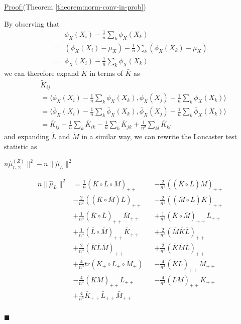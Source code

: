 \documentclass[]{article}
\newenvironment{claimproof}[1]{\par\noindent\underline{Proof:}\space#1}{\hfill $\blacksquare$}
\begin{document}
\begin{claimproof}(Theorem \ref{theorem:norm-conv-in-prob})

By observing that
\begin{align*}
& \phi_X(X_i)- \frac{1}{n}\sum_k\phi_X(X_k) \\
= &  (\phi_X(X_i) - \mu_X) - \frac{1}{n}\sum_k (\phi_X(X_k) - \mu_X)\\
= &\bar\phi_X(X_i)- \frac{1}{n}\sum_k\bar\phi_X(X_k)
\end{align*}
we can therefore expand $\tilde{K}$ in terms of $\bar{K}$ as
\begin{align*}
&\tilde{K}_{ij} \\ 
&= \langle\phi_X(X_i)- \frac{1}{n}\sum_k\phi_X(X_k),\phi_X(X_j) - \frac{1}{n}\sum_k\phi_X(X_k)\rangle \\
&= \langle\bar\phi_X(X_i)- \frac{1}{n}\sum_k\bar\phi_X(X_k),\bar\phi_X(X_j) - \frac{1}{n}\sum_k\bar\phi_X(X_k)\rangle \\
&= \bar{K}_{ij} - \frac{1}{n}\sum_k\bar{K}_{ik} - \frac{1}{n}\sum_k\bar{K}_{jk} + \frac{1}{n^2}\sum_{kl}\bar{K}_{kl}
\end{align*}
and expanding $\tilde{L}$ and $\tilde{M}$ in a similar way, we can rewrite the Lancaster test statistic as

$n\hat \mu^{(Z)}_{L,2} \|^2 - n\|\hat \mu_L\|^2$

\begin{align*} 
n\|\hat \mu_L\|^2 &= 
\frac{1}{n}(\bar{K} \circ \bar{L}\circ \bar{M})_{++} &&-
\frac{2}{n^2}((\bar{K}\circ \bar{L}) \bar{M})_{++} \\&- 
\frac{2}{n^2}((\bar{K} \circ \bar{M}) \bar{L})_{++} &&- 
\frac{2}{n^2}((\bar{M} \circ \bar{L}) \bar{K})_{++} \\&+ 
\frac{1}{n^3}(\bar{K} \circ \bar{L})_{++} \bar{M}_{++} &&+ 
\frac{1}{n^3}(\bar{K} \circ \bar{M})_{++} \bar{L}_{++} \\&+ 
\frac{1}{n^3}(\bar{L} \circ \bar{M})_{++} \bar{K}_{++} &&+ 
\frac{2}{n^3}(\bar{M}\bar{K}\bar{L})_{++} \\&+ 
\frac{2}{n^3}(\bar{K}\bar{L}\bar{M})_{++} &&+ 
\frac{2}{n^3}(\bar{K}\bar{M}\bar{L})_{++} \\&+ 
\frac{4}{n^3}tr(\bar{K}_+ \circ \bar{L}_+ \circ \bar{M}_+) &&-
\frac{4}{n^4}(\bar{K} \bar{L})_{++} \bar{M}_{++} \\& - 
\frac{4}{n^4}(\bar{K}\bar{M})_{++}\bar{L}_{++} &&- 
\frac{4}{n^4}(\bar{L}\bar{M})_{++} \bar{K}_{++} \\&+
\frac{4}{n^5}\bar{K}_{++} \bar{L}_{++} \bar{M}_{++} \\
\end{align*}


\end{claimproof}
\end{document}
